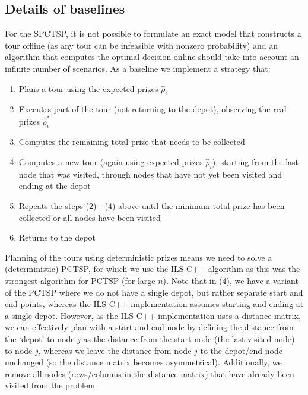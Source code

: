 \subsection{Details of baselines}
For the SPCTSP, it is not possible to formulate an exact model that constructs a tour offline (as any tour can be infeasible with nonzero probability) and an algorithm that computes the optimal decision online should take into account an infinite number of scenarios. As a baseline we implement a strategy that:
\begin{enumerate}
    \item Plans a tour using the expected prizes $\hat{\rho}_i$
    \item Executes part of the tour (not returning to the depot), observing the real prizes $\hat{\rho}^*_i$
    \item Computes the remaining total prize that needs to be collected
    \item Computes a new tour (again using expected prizes $\hat{\rho}_i$), starting from the last node that was visited, through nodes that have not yet been visited and ending at the depot
    \item Repeats the steps (2) - (4) above until the minimum total prize has been collected or all nodes have been visited
    \item Returns to the depot
\end{enumerate}

Planning of the tours using deterministic prizes means we need to solve a (deterministic) PCTSP, for which we use the ILS C++ algorithm as this was the strongest algorithm for PCTSP (for large $n$). Note that in (4), we have a variant of the PCTSP where we do not have a single depot, but rather separate start and end points, whereas the ILS C++ implementation assumes starting and ending at a single depot. However, as the ILS C++ implementation uses a distance matrix, we can effectively plan with a start and end node by defining the distance from the `depot' to node $j$ as the distance from the start node (the last visited node) to node $j$, whereas we leave the distance from node $j$ to the depot/end node unchanged (so the distance matrix becomes asymmetrical). Additionally, we remove all nodes (rows/columns in the distance matrix) that have already been visited from the problem.

